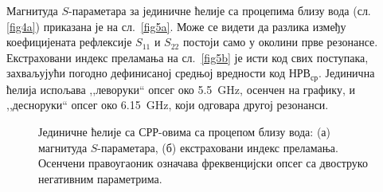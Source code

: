 \documentclass[main.tex]{subfiles}
\begin{document}
Магнитуда $S$-параметара за јединичне ћелије са процепима близу вода (сл. \ref{fig4a}) приказана је на сл.~\ref{fig5a}. Може се видети да разлика између коефицијената рефлексије $S_{11}$ и $S_{22}$ постоји само у околини прве резонансе. Екстраховани индекс преламања на сл.~\ref{fig5b} је исти код свих поступака, захваљујући погодно дефинисаној средњој вредности код $НРВ_{ср}$. Јединична ћелија испољава ,,леворуки`` опсег око \SI{5.5}{\giga\hertz}, осенчен на графику, и ,,десноруки`` опсег око \SI{6.15}{\giga\hertz}, који одговара другој резонанси.
\begin{figure}[!t]
\hfill
{}
\caption{Јединичне ћелије са СРР-овима са процепом близу вода: (а) магнитуда $S$-параметара, (б) екстраховани индекс преламања. Осенчени правоугаоник означава фреквенцијски опсег са двоструко негативним параметрима.}
\label{fig5}
\end{figure}
\end{document}
